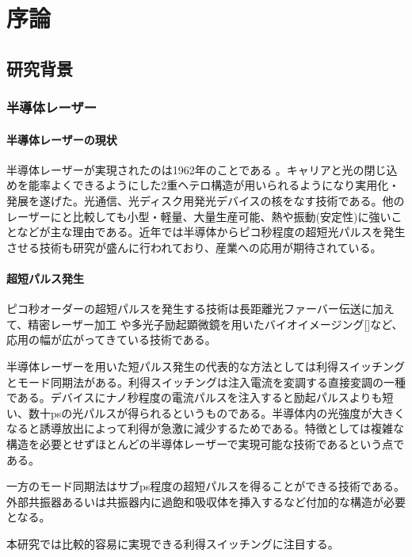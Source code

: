\chapter{序論}
\section{研究背景}
\subsection{半導体レーザー}
\subsubsection{半導体レーザーの現状}
半導体レーザーが実現されたのは1962年のことである 。キャリアと光の閉じ込めを能率よくできるようにした2重ヘテロ構造が用いられるようになり実用化・発展を遂げた。光通信、光ディスク用発光デバイスの核をなす技術である。他のレーザーにと比較しても小型・軽量、大量生産可能、熱や振動(安定性)に強いことなどが主な理由である。近年では半導体からピコ秒程度の超短光パルスを発生させる技術も研究が盛んに行われており、産業への応用が期待されている。
\subsubsection{超短パルス発生}
ピコ秒オーダーの超短パルスを発生する技術は長距離光ファーバー伝送\cite{ref_hasegawa}に加えて、精密レーザー加工\cite{ref_chichkov} や多光子励起顕微鏡を用いたバイオイメージング[]など、応用の幅が広がってきている技術である。

半導体レーザーを用いた短パルス発生の代表的な方法としては利得スイッチングとモード同期法がある。利得スイッチング\cite{ref_h_ito}は注入電流を変調する直接変調の一種である。デバイスにナノ秒程度の電流パルスを注入すると励起パルスよりも短い、数十psの光パルスが得られるというものである。半導体内の光強度が大きくなると誘導放出によって利得が急激に減少するためである。特徴としては複雑な構造を必要とせずほとんどの半導体レーザーで実現可能な技術であるという点である。

一方のモード同期法はサブps程度の超短パルスを得ることができる技術である。外部共振器あるいは共振器内に過飽和吸収体を挿入するなど付加的な構造が必要となる。

本研究では比較的容易に実現できる利得スイッチングに注目する。

